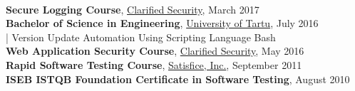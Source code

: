 \documentclass[a4paper, 12pt]{article}
\begin{document}
\\
\textbf{Secure Logging Course}, \href{https://clarifiedsecurity.com/secure-logging-training/}{Clarified Security}, March 2017\\
\textbf{Bachelor of Science in Engineering}, \href{https://www.ut.ee/en}{University of Tartu}, July 2016\\
\indent | Version Update Automation Using Scripting Language Bash\\
\textbf{Web Application Security Course}, \href{https://www.clarifiedsecurity.com/web-application-security-training/}{Clarified Security}, May 2016\\
\textbf{Rapid Software Testing Course}, \href{http://www.satisfice.com/info_rst.shtml}{Satisfice, Inc.}, September 2011\\
\textbf{ISEB ISTQB Foundation Certificate in Software Testing}, August 2010

\pagestyle{empty}
\end{document}
